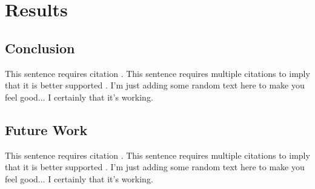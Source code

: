 %
%
\begingroup
\renewcommand{\cleardoublepage}{}
\renewcommand{\clearpage}{}
\chapter*{Results}\label{chap:Results}
\renewcommand{\chapter}[2]{}%



\section{Conclusion}
\label{sec:Results_Conclusion}

This sentence requires citation \cite{Devlin2019}. This sentence requires multiple citations to imply that it is better supported \citep{Kim2016,Rajpurkar2016}. I'm just adding some random text here to make you feel good... I certainly that it's working.

\section{Future Work}
\label{sec:Results_Future_Work}

This sentence requires citation \cite{Devlin2019}. This sentence requires multiple citations to imply that it is better supported \citep{Kim2016,Rajpurkar2016}. I'm just adding some random text here to make you feel good... I certainly that it's working.

\endgroup